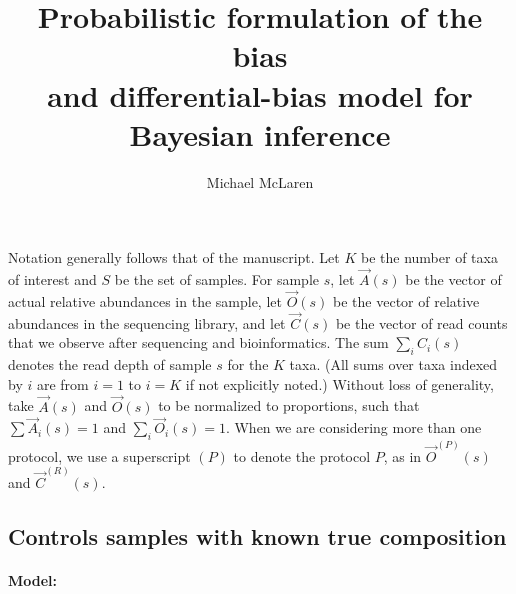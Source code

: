 

\author{Michael McLaren}
\title{Probabilistic formulation of the bias\\
  and differential-bias model for Bayesian inference}



\maketitle

Notation generally follows that of the manuscript. Let $K$ be the number of
taxa of interest and $S$ be the set of samples. For sample $s$, let $\vec A(s)$
be the vector of actual relative abundances in the sample, let $\vec O(s)$ be
the vector of relative abundances in the sequencing library, and let $\vec
C(s)$ be the vector of read counts that we observe after sequencing and
bioinformatics. The sum $\sum_i C_i(s)$ denotes the read depth of sample $s$
for the $K$ taxa. (All sums over taxa indexed by $i$ are from $i=1$ to $i=K$ if
not explicitly noted.) Without loss of generality, take $\vec A(s)$ and $\vec
O(s)$ to be normalized to proportions, such that $\sum \vec A_i(s) = 1$
and $\sum_i \vec O_i(s) = 1$.  When we are considering more than one protocol,
we use a superscript $(P)$ to denote the protocol $P$, as in $\vec O^{(P)}(s)$
and $\vec C^{(R)}(s)$.

\subsection{Controls samples with known true composition}

\paragraph{Model:}

